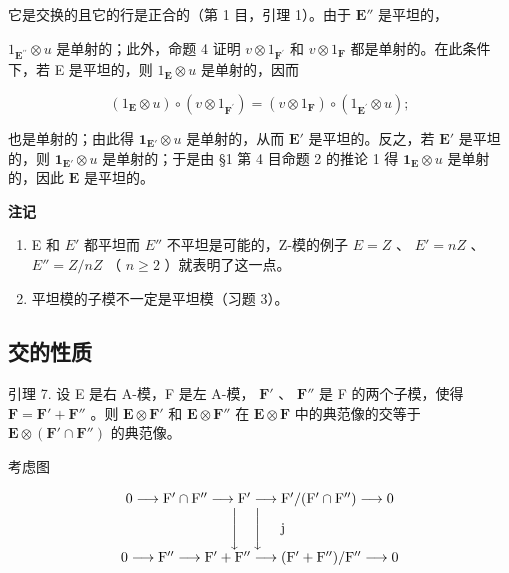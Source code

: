 它是交换的且它的行是正合的（第 1 目，引理 1）。由于 \(\mathbf{E}''\) 是平坦的，

\(1_{\mathbf{E}^{\prime \prime}} \otimes u\) 是单射的；此外，命题 4 证明 \(v \otimes 1_{\mathbf{F}^{\prime}}\) 和 \(v \otimes 1_{\mathbf{F}}\) 都是单射的。在此条件下，若 E 是平坦的，则 \(1_{\mathbf{E}} \otimes u\) 是单射的，因而

\[
\left(1 _ {\mathbf {E}} \otimes u\right) \circ (v \otimes 1 _ {\mathbf {F} ^ {\prime}}) = (v \otimes 1 _ {\mathbf {F}}) \circ \left(1 _ {\mathbf {E} ^ {\prime}} \otimes u\right);
\]

也是单射的；由此得 \(\mathbf{1}_{\mathbf{E}'} \otimes u\) 是单射的，从而 \(\mathbf{E}'\) 是平坦的。反之，若 \(\mathbf{E}'\) 是平坦的，则 \(\mathbf{1}_{\mathbf{E}'} \otimes u\) 是单射的；于是由 §1 第 4 目命题 2 的推论 1 得 \(\mathbf{1}_{\mathbf{E}} \otimes u\) 是单射的，因此 \(\mathbf{E}\) 是平坦的。

\textbf{注记}\par

\begin{enumerate}
\def\labelenumi{(\arabic{enumi})}
\item
  E 和 \(E'\) 都平坦而 \(E''\) 不平坦是可能的，Z-模的例子 \(E = Z\) 、 \(E' = nZ\) 、 \(E'' = Z/nZ\) （ \(n \geqslant 2\) ）就表明了这一点。
\item
  平坦模的子模不一定是平坦模（习题 3）。
\end{enumerate}

\subsection{交的性质}

引理 7. 设 E 是右 A-模，F 是左 A-模， \(\mathbf{F}'\) 、 \(\mathbf{F}''\) 是 F 的两个子模，使得 \(\mathbf{F} = \mathbf{F}' + \mathbf{F}''\) 。则 \(\mathbf{E} \otimes \mathbf{F}'\) 和 \(\mathbf{E} \otimes \mathbf{F}''\) 在 \(\mathbf{E} \otimes \mathbf{F}\) 中的典范像的交等于 \(\mathbf{E} \otimes (\mathbf{F}' \cap \mathbf{F}'')\) 的典范像。

考虑图

\[
\begin{array}{c} 0 \longrightarrow \mathrm{F} ^ {\prime} \cap \mathrm{F} ^ {\prime \prime} \longrightarrow \mathrm{F} ^ {\prime} \longrightarrow \mathrm{F} ^ {\prime} / (\mathrm{F} ^ {\prime} \cap \mathrm{F} ^ {\prime \prime}) \longrightarrow 0 \\ \Biggl \downarrow \quad \Biggl \downarrow \quad \text {   j   } \\ 0 \longrightarrow \mathrm{F} ^ {\prime \prime} \longrightarrow \mathrm{F} ^ {\prime} + \mathrm{F} ^ {\prime \prime} \longrightarrow (\mathrm{F} ^ {\prime} + \mathrm{F} ^ {\prime \prime}) / \mathrm{F} ^ {\prime \prime} \longrightarrow 0 \end{array}
\]

